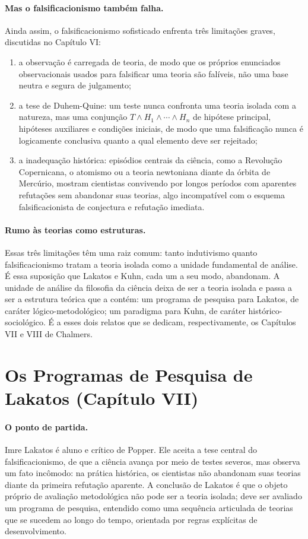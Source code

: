 \documentclass[9pt,a4paper]{extarticle}
\newcommand{\impt}[1]{\textcolor{important}{#1}}
\newcommand{\ntc}[1]{\textcolor{notice}{#1}}
\theoremstyle{definition}
\begin{document}
\paragraph{Mas o falsificacionismo também falha.}
Ainda assim, o falsificacionismo sofisticado enfrenta três limitações graves, discutidas no Capítulo VI:
\begin{enumerate}[label=(\roman*)]
  \item \impt{a observação é carregada de teoria}, de modo que os próprios enunciados observacionais usados para falsificar uma teoria são falíveis, não uma base neutra e segura de julgamento;
  \item a \impt{tese de Duhem-Quine}: um teste nunca confronta uma teoria isolada com a natureza, mas uma conjunção $T \wedge H_1 \wedge \cdots \wedge H_n$ de hipótese principal, hipóteses auxiliares e condições iniciais, de modo que uma falsificação nunca é logicamente conclusiva quanto a qual elemento deve ser rejeitado;
  \item a \impt{inadequação histórica}: episódios centrais da ciência, como a Revolução Copernicana, o atomismo ou a teoria newtoniana diante da órbita de Mercúrio, mostram cientistas convivendo por longos períodos com aparentes refutações sem abandonar suas teorias, algo incompatível com o esquema falsificacionista de conjectura e refutação imediata.
\end{enumerate}

\paragraph{Rumo às teorias como estruturas.}
Essas três limitações têm uma raiz comum: tanto indutivismo quanto falsificacionismo tratam a \impt{teoria isolada} como a unidade fundamental de análise. É essa suposição que Lakatos e Kuhn, cada um a seu modo, abandonam. A unidade de análise da filosofia da ciência deixa de ser a teoria isolada e passa a ser a \impt{estrutura teórica} que a contém: um \ntc{programa de pesquisa} para Lakatos, de caráter lógico-metodológico; um \ntc{paradigma} para Kuhn, de caráter histórico-sociológico. É a esses dois relatos que se dedicam, respectivamente, os Capítulos VII e VIII de Chalmers.

\section{Os Programas de Pesquisa de Lakatos (Capítulo VII)}

\paragraph{O ponto de partida.}
Imre Lakatos é aluno e crítico de Popper. Ele aceita a tese central do falsificacionismo, de que a ciência avança por meio de testes severos, mas observa um fato incômodo: na prática histórica, os cientistas \impt{não} abandonam suas teorias diante da primeira refutação aparente. A conclusão de Lakatos é que o objeto próprio de avaliação metodológica não pode ser a teoria isolada; deve ser avaliado um \impt{programa de pesquisa}, entendido como uma sequência articulada de teorias que se sucedem ao longo do tempo, orientada por regras explícitas de desenvolvimento.
\end{document}
